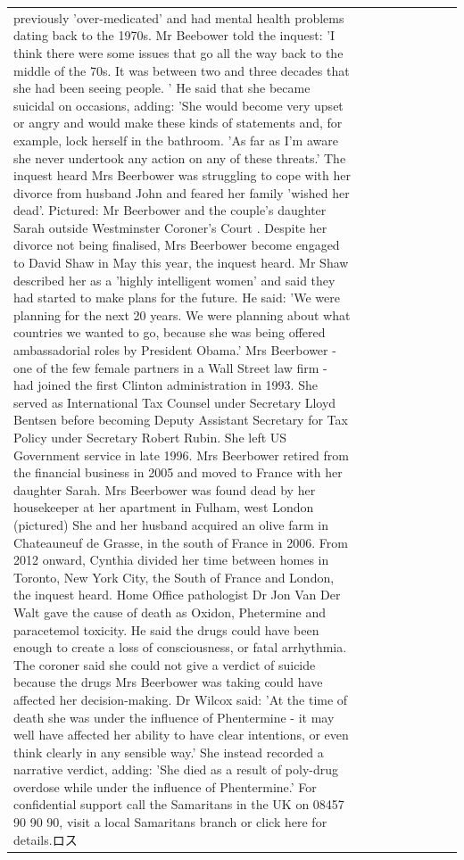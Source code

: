 \begin{table}[H]
\begin{tabular}{lllrlllll}
previously 'over-medicated' and had mental health problems dating back to the 1970s. Mr Beebower told the inquest: 'I think there were some issues that go all the way back to the middle of the 70s. It was between two and three decades that she had been seeing people. ' He said that she became suicidal on occasions, adding: 'She would become very upset or angry and would make these kinds of statements and, for example, lock herself in the bathroom. 'As far as I'm aware she never undertook any action on any of these threats.' The inquest heard Mrs Beerbower was struggling to cope with her divorce from husband John and feared her family 'wished her dead'. Pictured: Mr Beerbower and the couple's daughter Sarah outside Westminster Coroner's Court . Despite her divorce not being finalised, Mrs Beerbower become engaged to David Shaw in May this year, the inquest heard. Mr Shaw described her as a 'highly intelligent women' and said they had started to make plans for the future. He said: 'We were planning for the next 20 years. We were planning about what countries we wanted to go, because she was being offered ambassadorial roles by President Obama.' Mrs Beerbower - one of the few female partners in a Wall Street law firm - had joined the first Clinton administration in 1993. She served as International Tax Counsel under Secretary Lloyd Bentsen before becoming Deputy Assistant Secretary for Tax Policy under Secretary Robert Rubin. She left US Government service in late 1996. Mrs Beerbower retired from the financial business in 2005 and moved to France with her daughter Sarah. Mrs Beerbower was found dead by her housekeeper at her apartment in Fulham, west London (pictured) She and her husband acquired an olive farm in Chateauneuf de Grasse, in the south of France in 2006. From 2012 onward, Cynthia divided her time between homes in Toronto, New York City, the South of France and London, the inquest heard. Home Office pathologist Dr Jon Van Der Walt gave the cause of death as Oxidon, Phetermine and paracetemol toxicity. He said the drugs could have been enough to create a loss of consciousness, or fatal arrhythmia. The coroner said she could not give a verdict of suicide because the drugs Mrs Beerbower was taking could have affected her decision-making. Dr Wilcox said: 'At the time of death she was under the influence of Phentermine - it may well have affected her ability to have clear intentions, or even think clearly in any sensible way.' She instead recorded a narrative verdict, adding: 'She died as a result of poly-drug overdose while under the influence of Phentermine.' For confidential support call the Samaritans in the UK on 08457 90 90 90, visit a local Samaritans branch or click here for details.ロス \\

\end{tabular}
\end{table}
